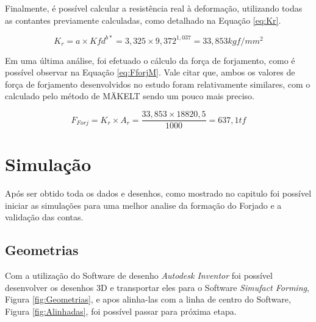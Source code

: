 \documentclass[deposito, acronym, symbols]{fei}
\begin{document}
Finalmente, é possível calcular a resistência real à deformação, utilizando todas as contantes previamente calculadas, como detalhado na Equação \ref{eq:Kr}.

\begin{equation}
    \label{eq:Kr}
    K_{r}= a\times Kfd^{b*} = 3,325\times9,372^{1,037}=33,853kgf/mm^2
\end{equation} 

Em uma última análise, foi efetuado o cálculo da força de forjamento, como é possível observar na Equação \ref{eq:FforjM}. Vale citar que, ambos os valores de força de forjamento desenvolvidos no estudo foram relativamente similares, com o calculado pelo método de MÄKELT sendo um pouco mais preciso.

\begin{equation}
    \label{eq:FforjM}
    F_{Forj}= K_{r}\times A_{r} = \frac{33,853\times18820,5}{1000}=637,1tf
\end{equation} 


\section{Simulação}

Após ser obtido toda os dados e desenhos, como mostrado no capitulo foi possível iniciar as simulações para uma melhor analise da formação do Forjado e a validação das contas. 

\subsection{Geometrias}

Com a utilização do Software de desenho \textit{Autodesk Inventor} foi possível desenvolver os desenhos 3D e transportar eles para o Software \textit{Simufact Forming}, Figura \ref{fig:Geometrias}, e apos alinha-las com a linha de centro do Software, Figura \ref{fig:Alinhadas},  foi possível passar para próxima etapa. 
\end{document}
